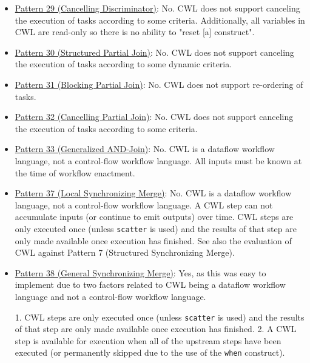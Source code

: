 \begin{itemize}
\item \href{http://www.workflowpatterns.com/patterns/control/new/wcp29.php}{Pattern 29 (Cancelling Discriminator)}: No. CWL does not support canceling the execution of tasks according to some criteria. Additionally, all variables in CWL are read-only so there is no ability to "reset [a] construct".

\item \href{http://www.workflowpatterns.com/patterns/control/new/wcp30.php}{Pattern 30 (Structured Partial Join)}: No. CWL does not support canceling the execution of tasks according to some dynamic criteria.

\item \href{http://www.workflowpatterns.com/patterns/control/new/wcp31.php}{Pattern 31 (Blocking Partial Join)}: No. CWL does not support re-ordering of tasks.

\item \href{http://www.workflowpatterns.com/patterns/control/new/wcp32.php}{Pattern 32 (Cancelling Partial Join)}: No. CWL does not support canceling the execution of tasks according to some criteria.

\item \href{http://www.workflowpatterns.com/patterns/control/new/wcp33.php}{Pattern 33 (Generalized AND-Join)}: No. CWL is a dataflow workflow language, not a control-flow workflow language. All inputs must be known at the time of workflow enactment.

\item \href{http://www.workflowpatterns.com/patterns/control/new/wcp37.php}{Pattern 37 (Local Synchronizing Merge)}: No. CWL is a dataflow workflow language, not a control-flow workflow language. A CWL step can not accumulate inputs (or continue to emit outputs) over time. CWL steps are only executed once (unless \verb|scatter| is used) and the results of that step are only made available once execution has finished. See also the evaluation of CWL against Pattern 7 (Structured Synchronizing Merge).

\item \href{http://www.workflowpatterns.com/patterns/control/new/wcp38.php}{Pattern 38 (General Synchronizing Merge)}: Yes, as this was easy to implement due to two factors related to CWL being a dataflow workflow language and not a control-flow workflow language.

1. CWL steps are only executed once (unless \verb|scatter| is used) and the results of that step are only made available once execution has finished.
2. A CWL step is available for execution when all of the upstream steps have been executed (or permanently skipped due to the use of the \verb|when| construct).


\end{itemize}
